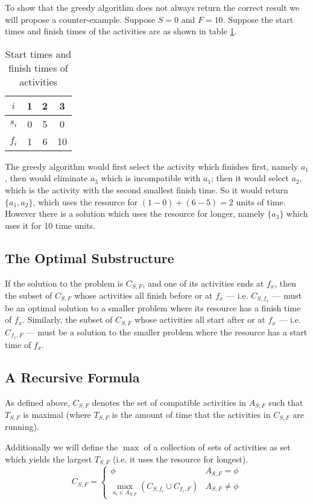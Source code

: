 \documentclass{article}
\begin{document}
To show that the greedy algorithm does not always return the correct result we will propose a counter-example. Suppose \(S = 0\) and \(F = 10\). Suppose the start times and finish times of the activities are as shown in table \ref{q3b-1}.

\begin{table}[hbtp]
	\centering
	\begin{tabular}{|c|ccc|}
		\hline
		\(i\)   & 1 & 2 & 3 \\
		\hline
		\(s_i\) & 0 & 5 & 0 \\
		\(f_i\) & 1 & 6 & 10 \\
		\hline
	\end{tabular}
	\caption{Start times and finish times of activities}
	\label{q3b-1}
\end{table}

The greedy algorithm would first select the activity which finishes first, namely \(a_1\), then would eliminate \(a_3\) which is incompatible with \(a_1\); then it would select \(a_2\), which is the activity with the second smallest finish time. So it would return \(\{a_1, a_2\}\), which uses the resource for \((1 - 0) + (6 - 5) = 2\) units of time. However there is a solution which uses the resource for longer, namely \(\{a_3\}\) which uses it for 10 time units.

\subsection{The Optimal Substructure}

If the solution to the problem is \(C_{S,F}\), and one of its activities ends at \(f_x\), then the subset of \(C_{S,F}\) whose activities all finish before or at \(f_x\) --- i.e. \(C_{S,f_x}\) --- must be an optimal solution to a smaller problem where its resource has a finish time of \(f_x\). Similarly, the subset of \(C_{S,F}\) whose activities all start after or at \(f_x\) --- i.e. \(C_{f_x,F}\) --- must be a solution to the smaller problem where the resource has a start time of \(f_x\).

\subsection{A Recursive Formula}

As defined above, \(C_{S,F}\) denotes the set of compatible activities in \(A_{S,F}\) such that \(T_{S,F}\) is maximal (where \(T_{S,F}\) is the amount of time that the activities in \(C_{S,F}\) are running).

Additionally we will define the \(\max\) of a collection of sets of activities as set which yields the largest \(T_{S,F}\) (i.e. it uses the resource for longest).
\begin{equation*}
	C_{S,F} =
	\begin{cases}
		\phi                                                                          & A_{S,F} = \phi    \\
		\displaystyle\max_{a_i \in A_{S,F}} \left( C_{S, f_i} \cup C_{f_i, F} \right) & A_{S,F} \neq \phi
	\end{cases}
\end{equation*}
\end{document}
